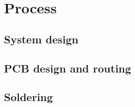 \section {Process}

\subsection{System design} \label{pcb:process:ss:system_design}

\subsection{PCB design and routing} \label{pcb:process:ss:pcb_design_and_soldering}

\subsection{Soldering} \label{pcb:process:ss:soldering}

